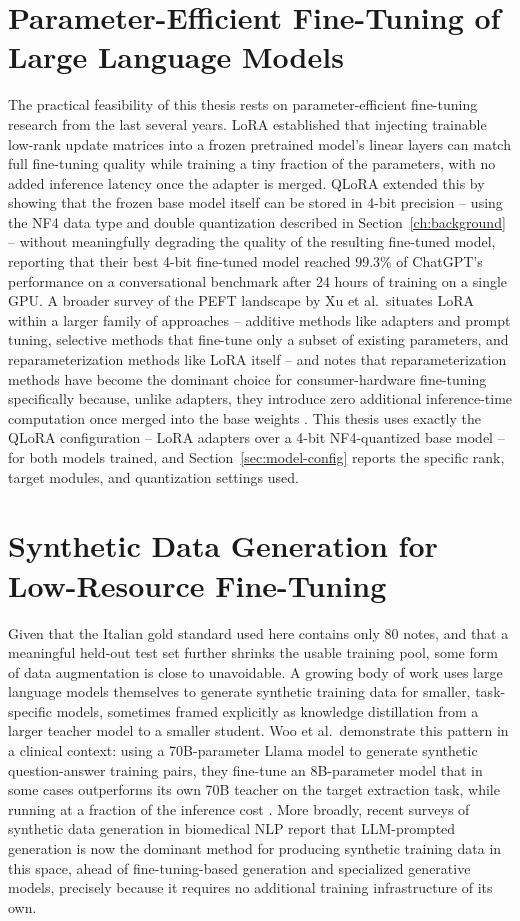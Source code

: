 \documentclass[12pt,a4paper]{report}
\begin{document}
\section{Parameter-Efficient Fine-Tuning of Large Language Models}

The practical feasibility of this thesis rests on parameter-efficient fine-tuning research from the last several years. LoRA \citep{hu2021lora} established that injecting trainable low-rank update matrices into a frozen pretrained model's linear layers can match full fine-tuning quality while training a tiny fraction of the parameters, with no added inference latency once the adapter is merged. QLoRA \citep{dettmers2023qlora} extended this by showing that the frozen base model itself can be stored in 4-bit precision -- using the NF4 data type and double quantization described in Section~\ref{ch:background} -- without meaningfully degrading the quality of the resulting fine-tuned model, reporting that their best 4-bit fine-tuned model reached 99.3\% of ChatGPT's performance on a conversational benchmark after 24 hours of training on a single GPU. A broader survey of the PEFT landscape by Xu et al.\ situates LoRA within a larger family of approaches -- additive methods like adapters and prompt tuning, selective methods that fine-tune only a subset of existing parameters, and reparameterization methods like LoRA itself -- and notes that reparameterization methods have become the dominant choice for consumer-hardware fine-tuning specifically because, unlike adapters, they introduce zero additional inference-time computation once merged into the base weights \citep{xu2024peft}. This thesis uses exactly the QLoRA configuration -- LoRA adapters over a 4-bit NF4-quantized base model -- for both models trained, and Section~\ref{sec:model-config} reports the specific rank, target modules, and quantization settings used.

\section{Synthetic Data Generation for Low-Resource Fine-Tuning}

Given that the Italian gold standard used here contains only 80 notes, and that a meaningful held-out test set further shrinks the usable training pool, some form of data augmentation is close to unavoidable. A growing body of work uses large language models themselves to generate synthetic training data for smaller, task-specific models, sometimes framed explicitly as knowledge distillation from a larger teacher model to a smaller student. Woo et al.\ demonstrate this pattern in a clinical context: using a 70B-parameter Llama model to generate synthetic question-answer training pairs, they fine-tune an 8B-parameter model that in some cases outperforms its own 70B teacher on the target extraction task, while running at a fraction of the inference cost \citep{woo2024syntheticdistillation}. More broadly, recent surveys of synthetic data generation in biomedical NLP report that LLM-prompted generation is now the dominant method for producing synthetic training data in this space, ahead of fine-tuning-based generation and specialized generative models, precisely because it requires no additional training infrastructure of its own.
\end{document}
